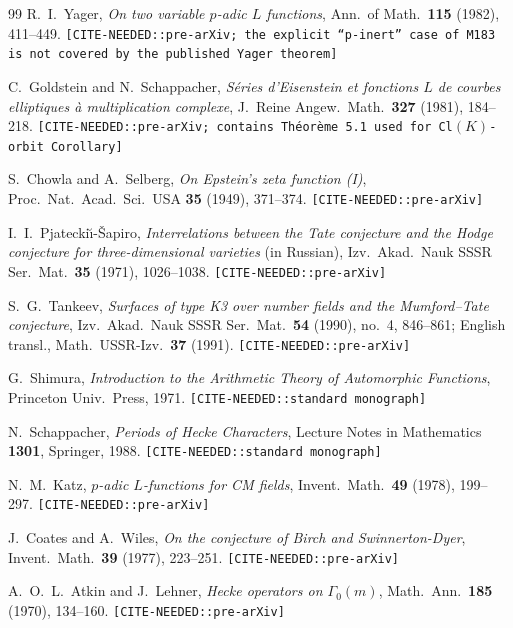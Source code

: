 \documentclass[12pt]{amsart}
\theoremstyle{definition}
\begin{document}
\begin{thebibliography}{99}
  R.~I.~Yager,
  \emph{On two variable $p$-adic $L$ functions},
  Ann.\ of Math.\ \textbf{115} (1982), 411--449.
  \texttt{[CITE-NEEDED::pre-arXiv; the explicit
   ``$p$-inert'' case of M183 is not covered by the published Yager theorem]}

  C.~Goldstein and N.~Schappacher,
  \emph{S\'eries d'Eisenstein et fonctions $L$ de courbes elliptiques \`a multiplication complexe},
  J.\ Reine Angew.\ Math.\ \textbf{327} (1981), 184--218.
  \texttt{[CITE-NEEDED::pre-arXiv;
   contains Th\'eor\`eme~5.1 used for Cl$(K)$-orbit Corollary]}

  S.~Chowla and A.~Selberg,
  \emph{On Epstein's zeta function (I)},
  Proc.\ Nat.\ Acad.\ Sci.\ USA \textbf{35} (1949), 371--374.
  \texttt{[CITE-NEEDED::pre-arXiv]}

  I.~I.~Pjatecki\u{\i}-\v{S}apiro,
  \emph{Interrelations between the Tate conjecture and the Hodge conjecture for three-dimensional varieties} (in Russian),
  Izv.\ Akad.\ Nauk SSSR Ser.\ Mat.\ \textbf{35} (1971), 1026--1038.
  \texttt{[CITE-NEEDED::pre-arXiv]}

  S.~G.~Tankeev,
  \emph{Surfaces of type K3 over number fields and the Mumford--Tate conjecture},
  Izv.\ Akad.\ Nauk SSSR Ser.\ Mat.\ \textbf{54} (1990), no.~4, 846--861;
  English transl., Math.\ USSR-Izv.\ \textbf{37} (1991).
  \texttt{[CITE-NEEDED::pre-arXiv]}

  G.~Shimura,
  \emph{Introduction to the Arithmetic Theory of Automorphic Functions},
  Princeton Univ.\ Press, 1971.
  \texttt{[CITE-NEEDED::standard monograph]}

  N.~Schappacher,
  \emph{Periods of Hecke Characters},
  Lecture Notes in Mathematics \textbf{1301}, Springer, 1988.
  \texttt{[CITE-NEEDED::standard monograph]}

  N.~M.~Katz,
  \emph{$p$-adic $L$-functions for CM fields},
  Invent.\ Math.\ \textbf{49} (1978), 199--297.
  \texttt{[CITE-NEEDED::pre-arXiv]}

  J.~Coates and A.~Wiles,
  \emph{On the conjecture of Birch and Swinnerton-Dyer},
  Invent.\ Math.\ \textbf{39} (1977), 223--251.
  \texttt{[CITE-NEEDED::pre-arXiv]}

  A.~O.~L.~Atkin and J.~Lehner,
  \emph{Hecke operators on $\Gamma_0(m)$},
  Math.\ Ann.\ \textbf{185} (1970), 134--160.
  \texttt{[CITE-NEEDED::pre-arXiv]}


\end{thebibliography}
\end{document}
